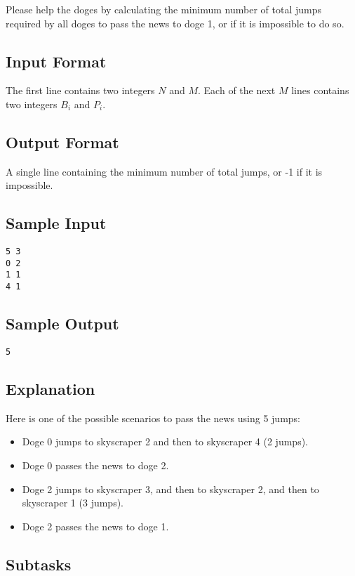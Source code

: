 \documentclass{report}
\begin{document}
Please help the doges by calculating the minimum number of total jumps required by all doges to pass the news to doge 1, or if it is impossible to do so.

\subsection*{Input Format}
The first line contains two integers $N$ and $M$. Each of the next $M$ lines contains two integers $B_i$ and $P_i$.

\subsection*{Output Format}
A single line containing the minimum number of total jumps, or -1 if it is impossible.

\subsection*{Sample Input}
\begin{verbatim}
5 3
0 2
1 1
4 1
\end{verbatim}

\subsection*{Sample Output}
\begin{verbatim}
5
\end{verbatim}

\subsection*{Explanation}
Here is one of the possible scenarios to pass the news using 5 jumps:
\begin{itemize} \itemsep1pt \parskip0pt
\item Doge 0 jumps to skyscraper 2 and then to skyscraper 4 (2 jumps).
\item Doge 0 passes the news to doge 2.
\item Doge 2 jumps to skyscraper 3, and then to skyscraper 2, and then to skyscraper 1 (3 jumps).
\item Doge 2 passes the news to doge 1.
\end{itemize}

\subsection*{Subtasks}
\end{document}
